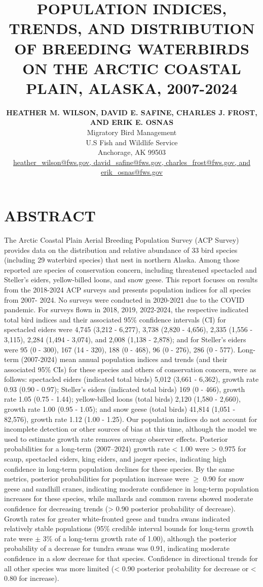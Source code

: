 \documentclass[
]{article}
\title{POPULATION INDICES, TRENDS, AND DISTRIBUTION OF BREEDING
WATERBIRDS ON THE ARCTIC COASTAL PLAIN, ALASKA, 2007-2024}
\author{\textbf{HEATHER M. WILSON, DAVID E. SAFINE, CHARLES J. FROST,
AND ERIK E. OSNAS}\\Migratory Bird Management\\U.S Fish and Wildlife
Service\\Anchorage, AK 99503\\\href{mailto:heather\_wilson@fws.gov,
david\_safine@fws.gov, charles\_frost@fws.gov, and
erik\_osnas@fws.gov}{heather\_wilson@fws.gov, david\_safine@fws.gov,
charles\_frost@fws.gov, and erik\_osnas@fws.gov}}
\date{}
\begin{document}
\maketitle


\section*{ABSTRACT}\label{abstract}

The Arctic Coastal Plain Aerial Breeding Population Survey (ACP Survey)
provides data on the distribution and relative abundance of 33 bird
species (including 29 waterbird species) that nest in northern Alaska.
Among those reported are species of conservation concern, including
threatened spectacled and Steller's eiders, yellow-billed loons, and
snow geese. This report focuses on results from the 2018-2024 ACP
surveys and presents population indices for all species from 2007- 2024.
No surveys were conducted in 2020-2021 due to the COVID pandemic. For
surveys flown in 2018, 2019, 2022-2024, the respective indicated total
bird indices and their associated 95\% confidence intervals (CI) for
spectacled eiders were 4,745 (3,212 - 6,277), 3,738 (2,820 - 4,656),
2,335 (1,556 - 3,115), 2,284 (1,494 - 3,074), and 2,008 (1,138 - 2,878);
and for Steller's eiders were 95 (0 - 300), 167 (14 - 320), 188 (0 -
468), 96 (0 - 276), 286 (0 - 577). Long-term (2007-2024) mean annual
population indices and trends (and their associated 95\% CIs) for these
species and others of conservation concern, were as follows: spectacled
eiders (indicated total birds) 5,012 (3,661 - 6,362), growth rate 0.93
(0.90 - 0.97); Steller's eiders (indicated total birds) 169 (0 - 466),
growth rate 1.05 (0.75 - 1.44); yellow-billed loons (total birds) 2,120
(1,580 - 2,660), growth rate 1.00 (0.95 - 1.05); and snow geese (total
birds) 41,814 (1,051 - 82,576), growth rate 1.12 (1.00 - 1.25). Our
population indices do not account for incomplete detection or other
sources of bias at this time, although the model we used to estimate
growth rate removes average observer effects. Posterior probabilities
for a long-term (2007--2024) growth rate \textless{} 1.00 were
\textgreater{} 0.975 for scaup, spectacled eiders, king eiders, and
jaeger species, indicating high confidence in long-term population
declines for these species. By the same metrics, posterior probabilities
for population increase were \(\geq\) 0.90 for snow geese and sandhill
cranes, indicating moderate confidence in long-term population increases
for these species, while mallards and common ravens showed moderate
confidence for decreasing trends (\textgreater{} 0.90 posterior
probability of decrease). Growth rates for greater white-fronted geese
and tundra swans indicated relatively stable populations (95\% credible
interval bounds for long-term growth rate were \(\pm\) 3\% of a
long-term growth rate of 1.00), although the posterior probability of a
decrease for tundra swans was 0.91, indicating moderate confidence in a
slow decrease for that species. Confidence in directional trends for all
other species was more limited (\textless{} 0.90 posterior probability
for decrease or \textless{} 0.80 for increase). \newline
\end{document}
